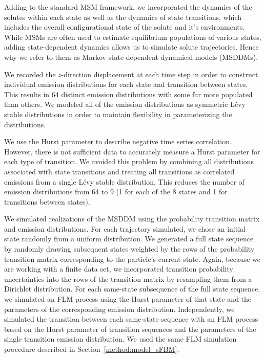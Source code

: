 \documentclass[aps,pre,preprint,groupedaddress,longbibliography]{revtex4-2}
\begin{document}
  Adding to the standard MSM framework, we incorporated the dynamics of the
  solutes within each state as well as the dynamics of state transitions, which
  includes the overall configurational state of the solute and it's
  environments. While MSMs are often used to estimate equilibrium populations
  of various states, adding state-dependent dynamics allows us to simulate
  solute trajectories. Hence why we refer to them as Markov state-dependent
  dynamical models (MSDDMs). 
  
  We recorded the $z$-direction displacement at each time step in order to
  construct individual emission distributions for each state and transition
  between states. This results in 64 distinct emission distributions with some
  far more populated than others. We modeled all of the emission distributions
  as symmetric L\'evy stable distributions in order to maintain flexibility in
  parameterizing the distributions.
  
  We use the Hurst parameter to describe negative time series correlation.
  However, there is not sufficient data to accurately measure a Hurst parameter
  for each type of transition. We avoided this problem by combining all
  distributions associated with state transitions and treating all transitions
  as correlated emissions from a single L\'evy stable distribution. This
  reduces the number of emission distributions from 64 to 9 (1 for each of the
  8 states and 1 for transitions between states).  
  
  We simulated realizations of the MSDDM using the probability transition
  matrix and emission distributions. For each trajectory simulated, we chose an
  initial state randomly from a uniform distribution. We generated a full state
  sequence by randomly drawing subsequent states weighted by the rows of the
  probability transition matrix corresponding to the particle's current state.
  Again, because we are working with a finite data set, we incorporated
  transition probability uncertainties into the rows of the transition matrix
  by resampling them from a Dirichlet distribution. For each same-state
  subsequence of the full state sequence, we simulated an FLM process using the
  Hurst parameter of that state and the parameters of the corresponding
  emission distribution. Independently, we simulated the transition between
  each same-state sequence with an FLM process based on the Hurst parameter of
  transition sequences and the parameters of the single transition emission
  distribution. We used the same FLM simulation procedure described in
  Section~\ref{method:model_sFBM}.
\end{document}
